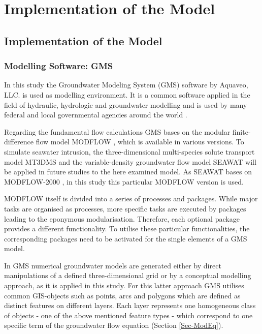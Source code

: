 
\chapter{Implementation of the Model}
\label{Chap-ImplMod}


\section{Implementation of the Model}

\subsection{Modelling Software: GMS}
\label{Sec-GMS}

In this study the Groundwater Modeling System (GMS) software by Aquaveo, LLC. is used as modelling environment. 
It is a common software applied in the field of hydraulic, hydrologic and groundwater modelling and is used by many federal and local governmental agencies around the world \parencite{Aquaveo.2021}.

Regarding the fundamental flow calculations GMS bases on the modular finite-difference flow model MODFLOW \parencite{McDonald.1988}, which is available in various versions. 
To simulate seawater intrusion, the three-dimensional multi-species solute transport model MT3DMS \parencite{Zheng.1999} and the variable-density groundwater flow model SEAWAT \parencite{Langevin.2009} will be applied in future studies to the here examined model. 
As SEAWAT bases on MODFLOW-2000 \parencite{Harbaugh.2000}, in this study this particular MODFLOW version is used.

MODFLOW itself is divided into a series of processes and packages. 
While major tasks are organised as processes, more specific tasks are executed by packages leading to the eponymous modularisation. 
Therefore, each optional package provides a different functionality. 
To utilise these particular functionalities, the corresponding packages need to be activated for the single elements of a GMS model.

In GMS numerical groundwater models are generated either by direct manipulations of a defined three-dimensional grid or by a conceptual modelling approach, as it is applied in this study. 
For this latter approach GMS utilises common GIS-objects such as points, arcs and polygons which are defined as distinct features on different layers. 
Each layer represents one homogeneous class of objects - one of the above mentioned feature types - which correspond to one specific term of the groundwater flow equation (Section \ref{Sec-ModEq}).

